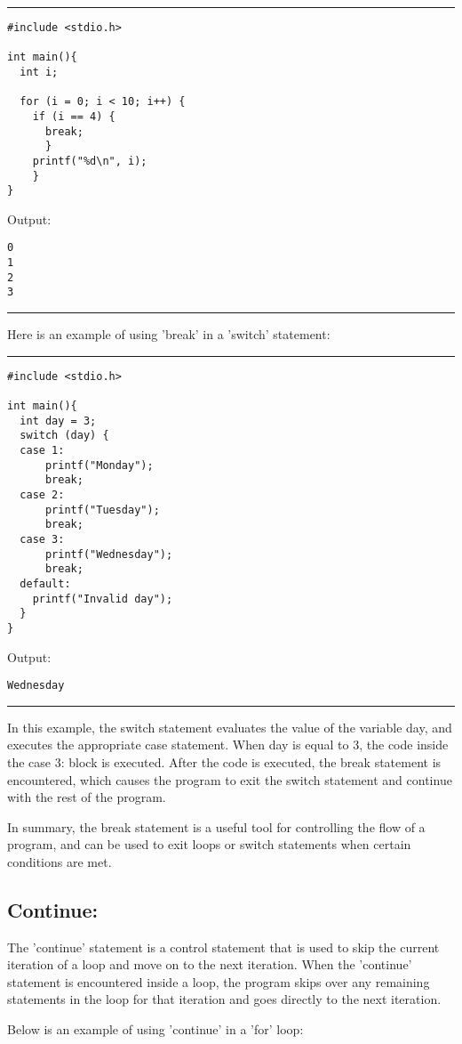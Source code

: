 \documentclass[a4paper]{article}
\begin{document}
\noindent\rule{\textwidth}{0.5pt}
\begin{verbatim}
#include <stdio.h>

int main(){
  int i;

  for (i = 0; i < 10; i++) {
    if (i == 4) {
      break;
      }
    printf("%d\n", i);
    }
}
\end{verbatim}
Output:
\begin{verbatim}
0
1
2
3
\end{verbatim}

\noindent\rule{\textwidth}{0.5pt}
Here is an example of using 'break' in a 'switch' statement:

\noindent\rule{\textwidth}{0.5pt}
\begin{verbatim}
#include <stdio.h>

int main(){
  int day = 3;
  switch (day) {
  case 1:
      printf("Monday");
      break;
  case 2:
      printf("Tuesday");
      break;
  case 3:
      printf("Wednesday");
      break;
  default:
    printf("Invalid day");
  }
}
\end{verbatim}
Output:
\begin{verbatim}
Wednesday
\end{verbatim}

\noindent\rule{\textwidth}{0.5pt}
In this example, the switch statement evaluates the value of the variable day,
and executes the appropriate case statement. When day is equal to 3, the code
inside the case 3: block is executed. After the code is executed, the break
statement is encountered, which causes the program to exit the switch statement
and continue with the rest of the program.

In summary, the break statement is a useful tool for controlling the flow of a
program, and can be used to exit loops or switch statements when certain
conditions are met.



\subsection{Continue:}
\label{sec:org0a7cb47}
The 'continue' statement is a control statement that is used to skip the current
iteration of a loop and move on to the next iteration. When the 'continue'
statement is encountered inside a loop, the program skips over any remaining
statements in the loop for that iteration and goes directly to the next
iteration.

Below is an example of using 'continue' in a 'for' loop:
\end{document}
